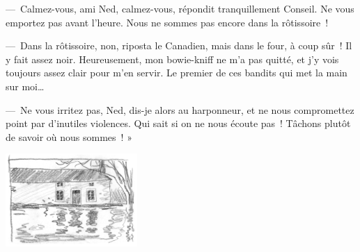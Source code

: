 \documentclass[petitlivre,chapnumsimple]{publivre}
\begin{document}
— Calmez-vous, ami Ned, calmez-vous, répondit tranquillement Conseil. Ne vous emportez pas avant l’heure. Nous ne sommes pas encore dans la rôtissoire !

— Dans la rôtissoire, non, riposta le Canadien, mais dans le four, à coup sûr ! Il y fait assez noir. Heureusement, mon bowie-kniff ne m’a pas quitté, et j’y vois toujours assez clair pour m’en servir. Le premier de ces bandits qui met la main sur moi…

— Ne vous irritez pas, Ned, dis-je alors au harponneur, et ne nous compromettez point par d’inutiles violences. Qui sait si on ne nous écoute pas ! Tâchons plutôt de savoir où nous sommes ! »

\includegraphics[width=5cm]{maison-etang.jpg}

\sommaire
\end{document}
